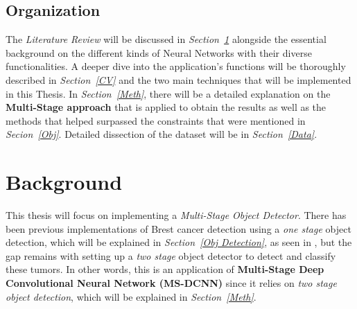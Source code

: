 \documentclass[12pt]{extarticle}
\begin{document}
	\subsection{Organization}\label{Org}
	The \emph{Literature Review} will be discussed in \emph{Section~\ref{Lit. Rev.}} alongside the essential background on the different kinds of Neural Networks with their diverse functionalities. A deeper dive into the application's functions will be thoroughly described in \emph{Section~\ref{CV}} and the two main techniques that will be implemented in this Thesis. In \emph{Section~\ref{Meth}}, there will be a detailed explanation on the \textbf{Multi-Stage approach} that is applied to obtain the results as well as the methods that helped surpassed the constraints that were mentioned in \emph{Secion~\ref{Obj}}. Detailed dissection of the dataset will be in \emph{Section~\ref{Data}}.
	\newpage
	\section{Background}\label{Lit. Rev.}
	This thesis will focus on implementing a \emph{Multi-Stage Object Detector}. There has been previous implementations of Brest cancer detection using a \emph{one stage} object detection, which will be explained in \emph{Section~\ref{Obj Detection}}, as seen in \cite{one_shot}, but the gap remains with setting up a \emph{two stage} object detector to detect and classify these tumors. In other words, this is an application of \textbf{Multi-Stage Deep Convolutional Neural Network (MS-DCNN)} since it relies on \emph{two stage object detection}, which will be explained in \emph{Section~\ref{Meth}}.
\end{document}
